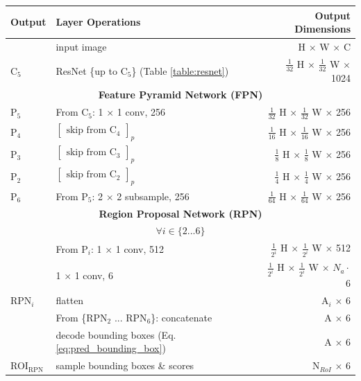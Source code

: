 {
\begin{table}[h]
\centering
\begin{tabular}{llr}
\toprule
\textbf{Output} & \textbf{Layer Operations} & \textbf{Output Dimensions} \\
\midrule\midrule
& input image & H $\times$ W $\times$ C \\
\midrule
C$_5$ & ResNet \{up to C$_5$\} (Table \ref{table:resnet})  & $\tfrac{1}{32}$ H $\times$ $\tfrac{1}{32}$ W $\times$ 1024 \\
\midrule
\multicolumn{3}{c}{\textbf{Feature Pyramid Network (FPN)}}\\
\midrule
P$_5$ & From C$_5$: 1 $\times$ 1 conv, 256 & $\tfrac{1}{32}$ H $\times$ $\tfrac{1}{32}$ W $\times$ 256 \\
P$_4$ & $\begin{bmatrix}\textrm{skip from C$_4$}\end{bmatrix}_p$ & $\tfrac{1}{16}$ H $\times$ $\tfrac{1}{16}$ W $\times$ 256 \\
P$_3$ & $\begin{bmatrix}\textrm{skip from C$_3$}\end{bmatrix}_p$ & $\tfrac{1}{8}$ H $\times$ $\tfrac{1}{8}$ W $\times$ 256 \\
P$_2$ & $\begin{bmatrix}\textrm{skip from C$_2$}\end{bmatrix}_p$ & $\tfrac{1}{4}$ H $\times$ $\tfrac{1}{4}$ W $\times$ 256 \\
P$_6$ & From P$_5$: 2 $\times$ 2 subsample, 256 & $\tfrac{1}{64}$ H $\times$ $\tfrac{1}{64}$ W $\times$ 256 \\
\midrule
\multicolumn{3}{c}{\textbf{Region Proposal Network (RPN)}}\\
\midrule
\multicolumn{3}{c}{$\forall i \in \{2...6\}$}\\
& From P$_i$: 1 $\times$ 1 conv, 512 & $\tfrac{1}{2^i}$ H $\times$ $\tfrac{1}{2^i}$ W $\times$ 512 \\
& 1 $\times$ 1 conv, 6 & $\tfrac{1}{2^i}$ H $\times$ $\tfrac{1}{2^i}$ W $\times$ $N_a \cdot$ 6 \\
RPN$_i$& flatten & A$_i$ $\times$ 6 \\
\midrule
& From \{RPN$_2$ ... RPN$_6$\}: concatenate & A $\times$ 6 \\
& decode bounding boxes (Eq. \ref{eq:pred_bounding_box}) & A $\times$ 6 \\
ROI$_{\mathrm{RPN}}$ & sample bounding boxes \& scores & N$_{RoI}$ $\times$ 6 \\
\midrule

\end{tabular}
\end{table}}
